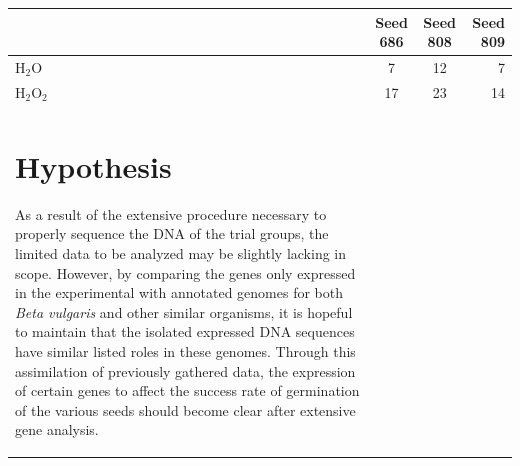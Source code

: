 \documentclass{article}
\begin{document}
\begin{tabular}{| l | c | c | r |}
\hline
& Seed 686 & Seed 808 & Seed 809 \\ \hline
H$_{2}$O & 7 & 12 & 7 \\ \hline
H$_{2}$O$_{2}$ & 17 & 23 & 14 \\ \hline

\section{Hypothesis}
	As a result of the extensive procedure necessary to properly sequence the DNA of the trial groups, the limited data to be analyzed may be slightly lacking in scope. However, by comparing the genes only expressed in the experimental with annotated genomes for both \emph{Beta vulgaris} and other similar organisms, it is hopeful to maintain that the isolated expressed DNA sequences have similar listed roles in these genomes. Through this assimilation of previously gathered data, the expression of certain genes to affect the success rate of germination of the various seeds should become clear after extensive gene analysis.

\end{tabular}
\end{document}
